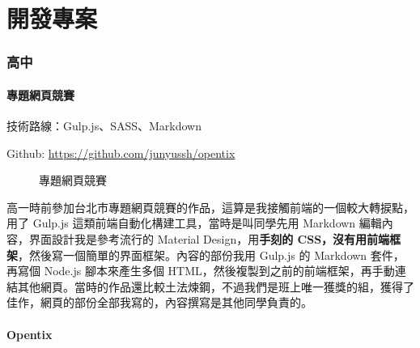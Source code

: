\documentclass[classical]{einfart}
\begin{document}
\setcounter{tocdepth}{2}
{\tableofcontents}

\newpage

\part{開發專案}

\section{高中}

\subsection{專題網頁競賽}

技術路線：Gulp.js、SASS、Markdown

Github: \url{https://github.com/junyussh/opentix}

\begin{figure}[H]
    \centering
    \caption{專題網頁競賽}
\end{figure}

高一時前參加台北市專題網頁競賽的作品，這算是我接觸前端的一個較大轉捩點，用了
Gulp.js 這類前端自動化構建工具，當時是叫同學先用 Markdown
編輯內容，界面設計我是參考流行的 Material Design，用\textbf{手刻的
CSS，沒有用前端框架}，然後寫一個簡單的界面框架。內容的部份我用 Gulp.js
的 Markdown 套件，再寫個 Node.js 腳本來產生多個
HTML，然後複製到之前的前端框架，再手動連結其他網頁。當時的作品還比較土法煉鋼，不過我們是班上唯一獲獎的組，獲得了佳作，網頁的部份全部我寫的，內容撰寫是其他同學負責的。

\subsection{Opentix}
\end{document}
